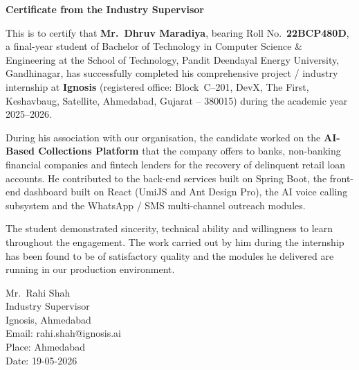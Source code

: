 \thispagestyle{plain}
\begin{center}
{\Large \bf Certificate from the Industry Supervisor}
\end{center}
\vspace{0.6cm}

\begin{justify}
This is to certify that {\bf Mr.~Dhruv Maradiya}, bearing Roll No.\ {\bf 22BCP480D}, a final-year student of Bachelor of Technology in Computer Science \& Engineering at the School of Technology, Pandit Deendayal Energy University, Gandhinagar, has successfully completed his comprehensive project / industry internship at {\bf Ignosis} (registered office: Block~C--201, DevX, The First, Keshavbaug, Satellite, Ahmedabad, Gujarat -- 380015) during the academic year 2025--2026.

\vspace{0.4cm}

During his association with our organisation, the candidate worked on the {\bf AI-Based Collections Platform} that the company offers to banks, non-banking financial companies and fintech lenders for the recovery of delinquent retail loan accounts. He contributed to the back-end services built on Spring Boot, the front-end dashboard built on React (UmiJS and Ant Design Pro), the AI voice calling subsystem and the WhatsApp / SMS multi-channel outreach modules.

\vspace{0.4cm}

The student demonstrated sincerity, technical ability and willingness to learn throughout the engagement. The work carried out by him during the internship has been found to be of satisfactory quality and the modules he delivered are running in our production environment.
\end{justify}

\vspace{2.5cm}

\noindent
Mr.~Rahi Shah\\
Industry Supervisor\\
Ignosis, Ahmedabad\\
Email: rahi.shah@ignosis.ai\\[0.6cm]

\noindent
Place: Ahmedabad\\[0.3cm]
Date: 19-05-2026

\clearpage
